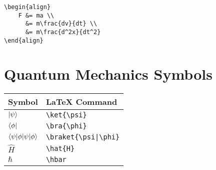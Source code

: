 \documentclass[11pt]{book}
\begin{document}
\begin{verbatim}
\begin{align}
    F &= ma \\
      &= m\frac{dv}{dt} \\
      &= m\frac{d^2x}{dt^2}
\end{align}
\end{verbatim}

\section{Quantum Mechanics Symbols}

\begin{tabular}{ll}
    \toprule
    Symbol & LaTeX Command \\
    \midrule
    $\ket{\psi}$ & \texttt{\textbackslash ket\{\textbackslash psi\}} \\
    $\bra{\phi}$ & \texttt{\textbackslash bra\{\textbackslash phi\}} \\
    $\braket{\psi|\phi}$ & \texttt{\textbackslash braket\{\textbackslash psi|\textbackslash phi\}} \\
    $\hat{H}$ & \texttt{\textbackslash hat\{H\}} \\
    $\hbar$ & \texttt{\textbackslash hbar} \\
    \bottomrule
\end{tabular}
\end{document}

